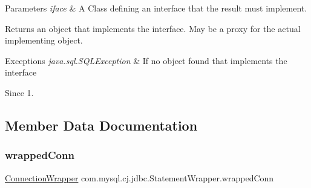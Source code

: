 \begin{DoxyParams}{Parameters}
{\em iface} & A Class defining an interface that the result must implement. \\
\hline
\end{DoxyParams}
\begin{DoxyReturn}{Returns}
an object that implements the interface. May be a proxy for the actual implementing object. 
\end{DoxyReturn}

\begin{DoxyExceptions}{Exceptions}
{\em java.\+sql.\+S\+Q\+L\+Exception} & If no object found that implements the interface \\
\hline
\end{DoxyExceptions}
\begin{DoxySince}{Since}
1. 
\end{DoxySince}


\subsection{Member Data Documentation}
\mbox{\label{classcom_1_1mysql_1_1cj_1_1jdbc_1_1_statement_wrapper_aa24a3511780470aabd51d2a769217c21}} 
\subsubsection{\texorpdfstring{wrapped\+Conn}{wrappedConn}}
{\footnotesize\ttfamily \mbox{\hyperlink{classcom_1_1mysql_1_1cj_1_1jdbc_1_1_connection_wrapper}{Connection\+Wrapper}} com.\+mysql.\+cj.\+jdbc.\+Statement\+Wrapper.\+wrapped\+Conn\hspace{0.3cm}{\ttfamily [protected]}}

\mbox{\label{classcom_1_1mysql_1_1cj_1_1jdbc_1_1_statement_wrapper_a237cb10a8c5fbde91ad58f91d4448504}} 
